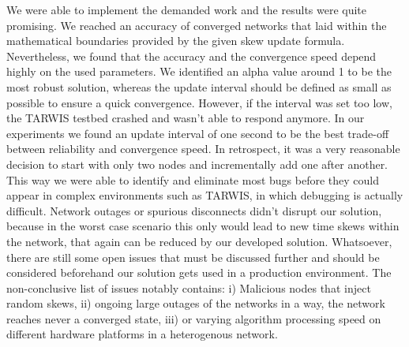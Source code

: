 \documentclass{llncs}
\begin{document}
	We were able to implement the demanded work and the results were quite promising. We reached an accuracy of converged networks that laid within the mathematical boundaries provided by the given skew update formula. Nevertheless, we found that the accuracy and the convergence speed depend highly on the used parameters. We identified an alpha value around 1 to be the most robust solution, whereas the update interval should be defined as small as possible to ensure a quick convergence. However, if the interval was set too low, the TARWIS testbed crashed and wasn't able to respond anymore. In our experiments we found an update interval of one second to be the best trade-off between reliability and convergence speed. In retrospect, it was a very reasonable decision to start with only two nodes and incrementally add one after another. This way we were able to identify and eliminate most bugs before they could appear in complex environments such as TARWIS, in which debugging is actually difficult. Network outages or spurious disconnects didn't disrupt our solution, because in the worst case scenario this only would lead to new time skews within the network, that again can be reduced by our developed solution. Whatsoever, there are still some open issues that must be discussed further and should be considered beforehand our solution gets used in a production environment. The non-conclusive list of issues notably contains: i) Malicious nodes that inject random skews, ii) ongoing large outages of the networks in a way, the network reaches never a converged state, iii) or varying algorithm processing speed on different hardware platforms in a heterogenous network.
	
	{}
	
	
	
	
	
\end{document}

